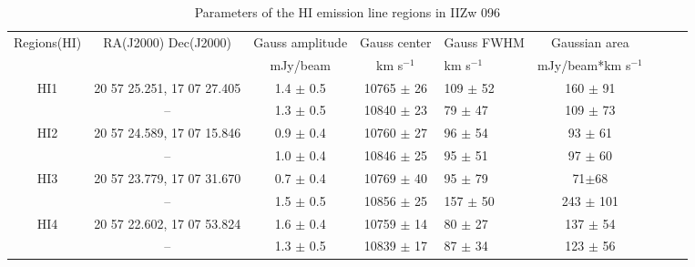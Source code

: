\documentclass[]{aa} %
\newcommand{\kms}{km s$^{-1}$\xspace}
\begin{document}
\begin{table*}
       \caption{Parameters of the HI emission line regions in IIZw 096}
     \label{Regions-HI}
  \begin{center}
  \begin{tabular}{c c c c l c c c c}     %
  \hline\hline
 Regions(HI) & RA(J2000)  Dec(J2000)       &  Gauss amplitude     & Gauss center          & Gauss FWHM         & Gaussian area     \\
              &                            & mJy/beam             & \kms                  & \kms                 & mJy/beam*\kms           \\
  \hline
     HI1   %
             & 20 57 25.251, 17 07 27.405                         &  1.4 $\pm$ 0.5         & 10765 $\pm$ 26      & 109 $\pm$ 52       & 160 $\pm$ 91      \\
             & --                          &  1.3 $\pm$ 0.5         & 10840 $\pm$ 23      &  79 $\pm$ 47       & 109 $\pm$ 73     \\

     HI2    %
             &20 57 24.589, 17 07 15.846                         &  0.9 $\pm$ 0.4         & 10760 $\pm$ 27      & 96 $\pm$ 54       & 93 $\pm$ 61     \\
             & --                          &  1.0 $\pm$ 0.4         & 10846 $\pm$ 25      & 95 $\pm$ 51       & 97 $\pm$ 60     \\

     HI3    %
             &  20 57 23.779, 17 07 31.670                          &  0.7 $\pm$ 0.4         & 10769 $\pm$ 40      & 95  $\pm$ 79      &  71$\pm$68     \\
             & --                          &  1.5 $\pm$ 0.5         & 10856 $\pm$ 25      & 157 $\pm$ 50      & 243 $\pm$ 101    \\

     HI4    %
             & 20 57 22.602, 17 07 53.824                          &  1.6 $\pm$ 0.4         & 10759 $\pm$ 14      & 80  $\pm$ 27      & 137 $\pm$ 54     \\
             & --                          &  1.3 $\pm$ 0.5         & 10839 $\pm$ 17      & 87  $\pm$ 34      & 123 $\pm$ 56     \\


\end{tabular}
\end{center}
\end{table*}
\end{document}
